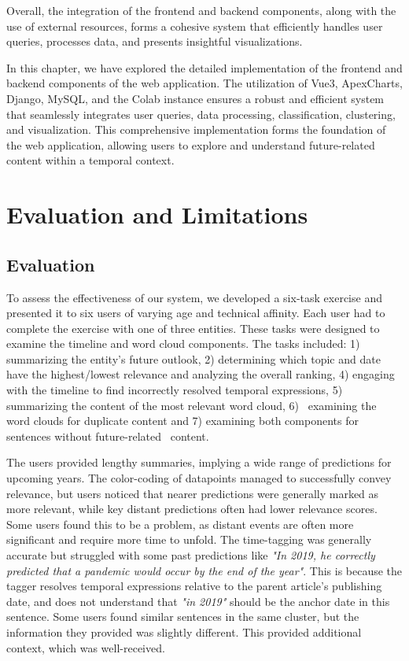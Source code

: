 \documentclass[a4paper,10pt]{report} %
\begin{document}
Overall, the integration of the frontend and backend components, along with the use of external resources, forms a cohesive system that efficiently handles user queries, processes data, and presents insightful visualizations.

In this chapter, we have explored the detailed implementation of the frontend and backend components of the web application. The utilization of Vue3, ApexCharts, Django, MySQL, and the Colab instance ensures a robust and efficient system that seamlessly integrates user queries, data processing, classification, clustering, and visualization. This comprehensive implementation forms the foundation of the web application, allowing users to explore and understand future-related content within a temporal context.

\chapter{Evaluation and Limitations}

\section{Evaluation}

To assess the effectiveness of our system, we developed a six-task exercise and presented it to six users of varying age and technical affinity. Each user had to complete the exercise with one of three entities. These tasks were designed to examine the timeline and word cloud components. The tasks included: 1) summarizing the entity's future outlook, 2) determining which topic and date have the highest/lowest relevance and analyzing the overall ranking, 4) engaging with the timeline to find incorrectly resolved temporal expressions, 5) summarizing the content of the most relevant word cloud, 6)~ examining the word clouds for duplicate content and 7) examining both components for sentences without future-related~ content.

The users provided lengthy summaries, implying a wide range of predictions for upcoming years. The color-coding of datapoints managed to successfully convey relevance, but users noticed that nearer predictions were generally marked as more relevant, while key distant predictions often had lower relevance scores. Some users found this to be a problem, as distant events are often more significant and require more time to unfold. The time-tagging was generally accurate but struggled with some past predictions like \textit{"In 2019, he correctly predicted that a pandemic would occur by the end of the year"}. This is because the tagger resolves temporal expressions relative to the parent article's publishing date, and does not understand that \textit{"in 2019"} should be the anchor date in this sentence. Some users found similar sentences in the same cluster, but the information they provided was slightly different. This provided additional context, which was well-received.
\end{document}
